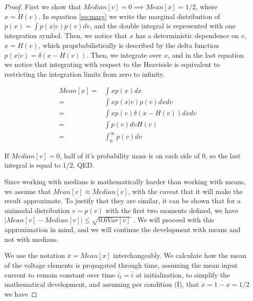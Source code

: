 \begin{proof}



First we show that $Median[v]=0\implies Mean[x]=1/2$, where $x = \tilde{H}(v)$. In equation \ref{eq:marg} we write the marginal distribution of $p(x)=\int p(x|v)p(v)dv$, and the double integral is represented with one integration symbol. Then, we notice that $x$ has a deterministic dependence on $v$, $x=H(v)$, which proprbabilistically is described by the delta function $p(x|v)=\delta(x - H(v))$. Then, we integrate over $x$, and in the last equation we notice that integrating with respect to the Heaviside is equivalent to restricting the integration limits from zero to infinity.

\begin{align}
    Mean[x] =& \int xp(x) dx \\
    =& \int xp(x|v)p(v)dxdv  \label{eq:marg}\\
    =& \int x p(v)\delta(x - H(v))dxdv\\
    =& \int p(v)dv H(v)\\
    =& \int_0^{\infty} p(v)dv
\end{align}


If $Median[v]=0$, half of it's probability mass is on each side of $0$, so the last integral is equal to $1/2$, QED.

Since working with medians is mathematically harder than working with means, we assume that $Mean[v]\approx Median[v]$, with the caveat that it will make the result approximate. To justify that they are similar, it can be shown that for a unimodal distribution $v\sim p(v)$ with the first two moments defined, we have $|Mean[v]-Median[v]|\leq\sqrt{0.6Var[v]}$ \cite{basu1997mean}. We will proceed with this approximation in mind, and we will continue the development with means and not with medians.

We use the notation $\overline{x}=Mean[x]$ interchangeably.
We calculate how the mean of the voltage elements is propagated through time, assuming the mean input current to remain constant over time $\overline{i}_t = \overline{i}$ at initialization, to simplify the mathematical development, and assuming per condition (I), that $\overline{x} = \overline{1-x}=1/2$ we have


\end{proof}
